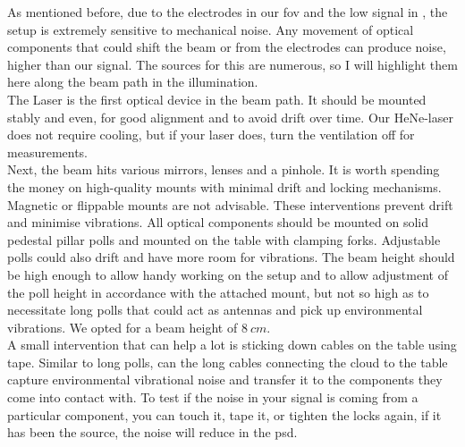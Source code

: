         As mentioned before, due to the electrodes in our \gls{fov} and the low signal in \scat, the setup is extremely sensitive to mechanical noise. Any movement of optical components that could shift the beam or from the electrodes can produce noise, higher than our signal. The sources for this are numerous, so I will highlight them here along the beam path in the illumination. \\ 
        The Laser is the first optical device in the beam path. It should be mounted stably and even, for good alignment and to avoid drift over time. Our HeNe-laser does not require cooling, but if your laser does, turn the ventilation off for measurements. \\ 
        Next, the beam hits various mirrors, lenses and a pinhole. It is worth spending the money on high-quality mounts with minimal drift and locking mechanisms. Magnetic or flippable mounts are not advisable. These interventions prevent drift and minimise vibrations. All optical components should be mounted on solid pedestal pillar polls and mounted on the table with clamping forks. Adjustable polls could also drift and have more room for vibrations. The beam height should be high enough to allow handy working on the setup and to allow adjustment of the poll height in accordance with the attached mount, but not so high as to necessitate long polls that could act as antennas and pick up environmental vibrations. We opted for a beam height of $8~cm$.\\ 
        A small intervention that can help a lot is sticking down cables on the table using tape. Similar to long polls, can the long cables connecting the cloud to the table capture environmental vibrational noise and transfer it to the components they come into contact with. To test if the noise in your signal is coming from a particular component, you can touch it, tape it, or tighten the locks again, if it has been the source, the noise will reduce in the \gls{psd}.\\\\
